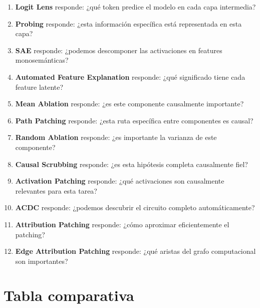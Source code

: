 \documentclass[11pt,a4paper]{report}
\theoremstyle{definition}
\begin{document}
\begin{enumerate}
    \item \textbf{Logit Lens} responde: ¿qué token predice el modelo en cada capa intermedia?
    \item \textbf{Probing} responde: ¿esta información específica está representada en esta capa?
    \item \textbf{SAE} responde: ¿podemos descomponer las activaciones en features monosemánticas?
    \item \textbf{Automated Feature Explanation} responde: ¿qué significado tiene cada feature latente?
    \item \textbf{Mean Ablation} responde: ¿es este componente causalmente importante?
    \item \textbf{Path Patching} responde: ¿esta ruta específica entre componentes es causal?
    \item \textbf{Random Ablation} responde: ¿es importante la varianza de este componente?
    \item \textbf{Causal Scrubbing} responde: ¿es esta hipótesis completa causalmente fiel?
    \item \textbf{Activation Patching} responde: ¿qué activaciones son causalmente relevantes para esta tarea?
    \item \textbf{ACDC} responde: ¿podemos descubrir el circuito completo automáticamente?
    \item \textbf{Attribution Patching} responde: ¿cómo aproximar eficientemente el patching?
    \item \textbf{Edge Attribution Patching} responde: ¿qué aristas del grafo computacional son importantes?
\end{enumerate}

\section{Tabla comparativa}
\end{document}
